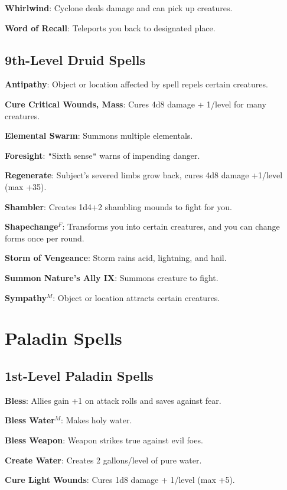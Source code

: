\textbf{Whirlwind}: Cyclone deals damage and can pick up creatures.

\textbf{Word of Recall}: Teleports you back to designated place.

\subsection{9th-Level Druid Spells}


\textbf{Antipathy}: Object or location affected by spell repels certain creatures.

\textbf{Cure Critical Wounds, Mass}: Cures 4d8 damage + 1/level for many creatures.

\textbf{Elemental Swarm}: Summons multiple elementals.

\textbf{Foresight}: \texttt{{}"{}}Sixth sense\texttt{{}"{}} warns of impending danger.

\textbf{Regenerate}: Subject's severed limbs grow back, cures 4d8 damage +1/level (max +35).

\textbf{Shambler}: Creates 1d4+2 shambling mounds to fight for you.

\textbf{Shapechange}\(^{F}\): Transforms you into certain creatures, and you can change forms once per round.

\textbf{Storm of Vengeance}: Storm rains acid, lightning, and hail.

\textbf{Summon Nature's Ally IX}: Summons creature to fight.

\textbf{Sympathy}\(^{M}\): Object or location attracts certain creatures.

\section{Paladin Spells}


\subsection{1st-Level Paladin Spells}


\textbf{Bless}: Allies gain +1 on attack rolls and saves against fear.

\textbf{Bless Water}\(^{M}\): Makes holy water.

\textbf{Bless Weapon}: Weapon strikes true against evil foes.

\textbf{Create Water}: Creates 2 gallons/level of pure water.

\textbf{Cure Light Wounds}: Cures 1d8 damage + 1/level (max +5).


